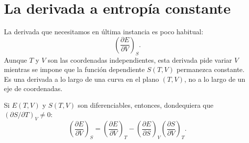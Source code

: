 \section{La derivada a entropía constante}

La derivada que necesitamos en última instancia es poco habitual: \[
 \left(\frac{\partial E}{\partial V}\right)_S.
\] Aunque \(T\) y \(V\) son las coordenadas independientes, esta derivada pide variar \(V\) mientras se impone que la función dependiente \(S(T,V)\) permanezca constante. Es una derivada a lo largo de una curva en el plano \((T,V)\), no a lo largo de un eje de coordenadas.

\begin{classroomqa}\end{classroomqa}

\begin{lemma}Si \(E(T,V)\) y \(S(T,V)\) son diferenciables, entonces, dondequiera que \((\partial S/\partial T)_V\neq0\): \begin{equation}
 \left(\frac{\partial E}{\partial V}\right)_S
 =
 \left(\frac{\partial E}{\partial V}\right)_T
 -
 \left(\frac{\partial E}{\partial S}\right)_V
 \left(\frac{\partial S}{\partial V}\right)_T.
 \label{eq:sm5-calculus-lemma}
\end{equation}\end{lemma}

